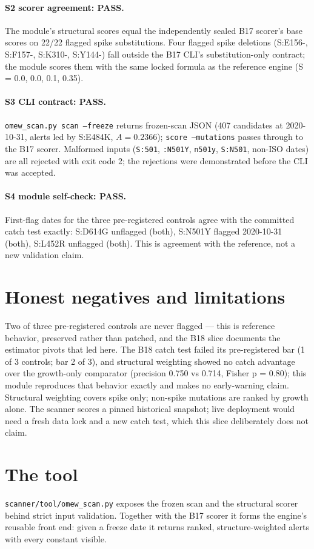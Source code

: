 \documentclass[11pt]{article}
\begin{document}
\paragraph{S2 scorer agreement: PASS.} The module's structural scores equal the
independently sealed B17 scorer's base scores on 22/22 flagged spike
substitutions. Four flagged spike deletions (S:E156-, S:F157-, S:K310-, S:Y144-)
fall outside the B17 CLI's substitution-only contract; the module scores them
with the same locked formula as the reference engine (S = 0.0, 0.0, 0.1, 0.35).
\paragraph{S3 CLI contract: PASS.} \texttt{omew\_scan.py scan --freeze}
returns frozen-scan JSON (407 candidates at 2020-10-31, alerts led by S:E484K,
$A=0.2366$); \texttt{score --mutations} passes through to the B17 scorer.
Malformed inputs (\texttt{S:501}, \texttt{:N501Y}, \texttt{n501y},
\texttt{S:N501}, non-ISO dates) are all rejected with exit code 2; the
rejections were demonstrated before the CLI was accepted.
\paragraph{S4 module self-check: PASS.} First-flag dates for the three
pre-registered controls agree with the committed catch test exactly:
S:D614G unflagged (both), S:N501Y flagged 2020-10-31 (both), S:L452R unflagged (both). This is agreement with the reference,
not a new validation claim.

\section{Honest negatives and limitations}
Two of three pre-registered controls are never flagged --- this is reference
behavior, preserved rather than patched, and the B18 slice documents the
estimator pivots that led here. The B18 catch test failed its pre-registered
bar (1 of 3 controls; bar 2 of 3), and structural weighting showed no catch
advantage over the growth-only comparator (precision 0.750 vs 0.714, Fisher
p = 0.80); this module reproduces that behavior exactly and makes no
early-warning claim. Structural weighting covers spike only;
non-spike mutations are ranked by growth alone. The scanner scores a pinned
historical snapshot; live deployment would need a fresh data lock and a new
catch test, which this slice deliberately does not claim.

\section{The tool}
\texttt{scanner/tool/omew\_scan.py} exposes the frozen scan and the structural
scorer behind strict input validation. Together with the B17 scorer it forms
the engine's reusable front end: given a freeze date it returns ranked,
structure-weighted alerts with every constant visible.
\end{document}
